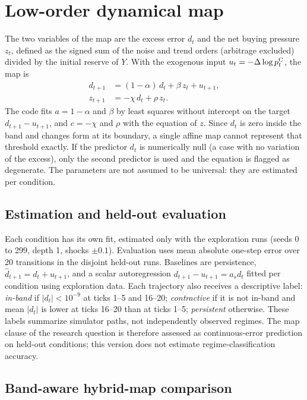 \section{Low-order dynamical map}

The two variables of the map are the excess error $d_t$ and the net buying pressure $z_t$, defined as the signed sum of the noise and trend orders (arbitrage excluded) divided by the initial reserve of $Y$. With the exogenous input $u_t=-\Delta\log p^{\mathrm{C}}_t$, the map is
\begin{align}
  d_{t+1} &= (1-\alpha)\,d_t + \beta\,z_t + u_{t+1}, \label{eq:mapa-d}\\
  z_{t+1} &= -\chi\,d_t + \rho\,z_t. \label{eq:mapa-z}
\end{align}
The code fits $a=1-\alpha$ and $\beta$ by least squares without intercept on the target $d_{t+1}-u_{t+1}$, and $c=-\chi$ and $\rho$ with the equation of $z$. Since $d_t$ is zero inside the band and changes form at its boundary, a single affine map cannot represent that threshold exactly. If the predictor $d_t$ is numerically null (a case with no variation of the excess), only the second predictor is used and the equation is flagged as degenerate. The parameters are not assumed to be universal: they are estimated per condition.


\subsection{Estimation and held-out evaluation}

Each condition has its own fit, estimated only with the exploration runs (seeds 0 to 299, depth 1, shocks $\pm0.1$). Evaluation uses mean absolute one-step error over 20 transitions in the disjoint held-out runs. Baselines are persistence, $\hat d_{t+1}=d_t+u_{t+1}$, and a scalar autoregression $d_{t+1}-u_{t+1}=a_s d_t$ fitted per condition using exploration data. Each trajectory also receives a descriptive label: \emph{in-band} if $|d_t|<10^{-9}$ at ticks 1--5 and 16--20; \emph{contractive} if it is not in-band and mean $|d_t|$ is lower at ticks 16--20 than at ticks 1--5; \emph{persistent} otherwise. These labels summarize simulator paths, not independently observed regimes. The map clause of the research question is therefore assessed as continuous-error prediction on held-out conditions; this version does not estimate regime-classification accuracy.

\subsection{Band-aware hybrid-map comparison}
\label{sec:hybrid-method}

